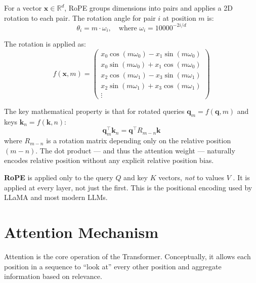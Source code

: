 \documentclass[11pt,a4paper]{article}
\newcommand{\R}{\mathbb{R}}
\begin{document}
For a vector $\bm{x} \in \R^d$, RoPE groups dimensions into pairs and applies a 2D
rotation to each pair. The rotation angle for pair $i$ at position $m$ is:
\begin{equation}
  \theta_i = m \cdot \omega_i, \quad \text{where } \omega_i = 10000^{-2i/d}
\end{equation}

The rotation is applied as:
\begin{equation}
  f(\bm{x}, m) =
  \begin{pmatrix}
    x_0 \cos(m\omega_0) - x_1 \sin(m\omega_0) \\
    x_0 \sin(m\omega_0) + x_1 \cos(m\omega_0) \\
    x_2 \cos(m\omega_1) - x_3 \sin(m\omega_1) \\
    x_2 \sin(m\omega_1) + x_3 \cos(m\omega_1) \\
    \vdots
  \end{pmatrix}
\end{equation}

The key mathematical property is that for rotated queries $\bm{q}_m = f(\bm{q}, m)$ and
keys $\bm{k}_n = f(\bm{k}, n)$:
\begin{equation}
  \bm{q}_m^\top \bm{k}_n = \bm{q}^\top R_{m-n} \bm{k}
\end{equation}
where $R_{m-n}$ is a rotation matrix depending only on the relative position $(m - n)$.
The dot product --- and thus the attention weight --- naturally encodes relative position
without any explicit relative position bias.

\begin{evobox}
\textbf{RoPE} is applied only to the query $Q$ and key $K$ vectors, \emph{not} to values
$V$ \cite{su2021}. It is applied at every layer, not just the first. This is the
positional encoding used by LLaMA \cite{touvron2023} and most modern LLMs.
\end{evobox}


\section{Attention Mechanism}
\label{sec:attention}

Attention is the core operation of the Transformer. Conceptually, it allows each position
in a sequence to ``look at'' every other position and aggregate information based on
relevance.
\end{document}
